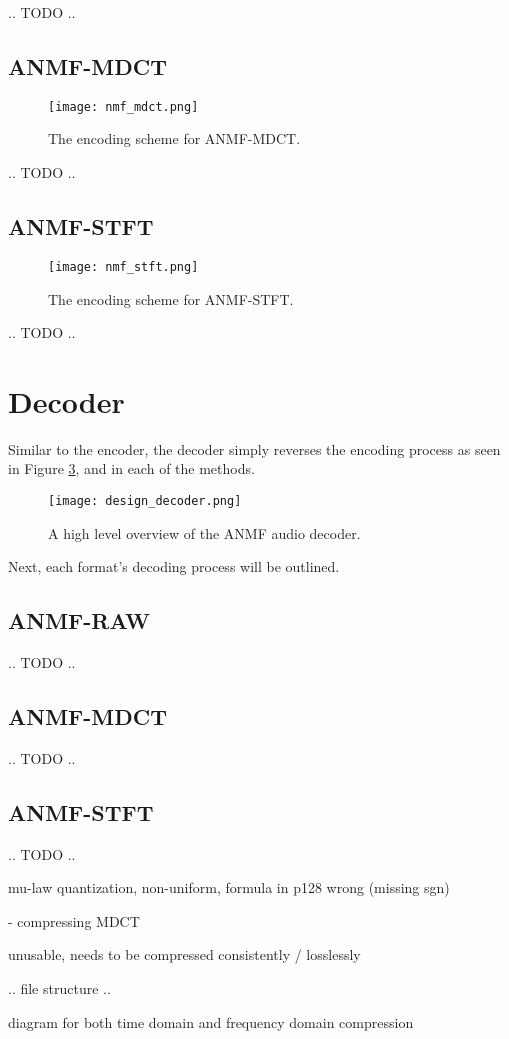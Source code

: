 .. TODO ..

\subsection{ANMF-MDCT}
\begin{figure}[ht]
	\label{fig:encoding_nmf_mdct}
	\caption[ANMF-MDCT Encoder]{The encoding scheme for ANMF-MDCT.}
	\centering
	\texttt{[image: nmf\_mdct.png]}
\end{figure}

.. TODO ..

\subsection{ANMF-STFT}
\begin{figure}[ht]
	\label{fig:encoding_nmf_stft}
	\caption[ANMF-STFT Encoder]{The encoding scheme for ANMF-STFT.}
	\centering
	\texttt{[image: nmf\_stft.png]}
\end{figure}

.. TODO ..

\section{Decoder}
Similar to the encoder, the decoder simply reverses the encoding process as seen in Figure \ref{fig:design_decoder}, and in each of the methods.

\begin{figure}[ht]
	\label{fig:design_decoder}
	\caption[Decoder overview]{A high level overview of the ANMF audio decoder.}
	\centering
	\texttt{[image: design\_decoder.png]}
\end{figure}

Next, each format's decoding process will be outlined.

\subsection{ANMF-RAW}
.. TODO ..

\subsection{ANMF-MDCT}
.. TODO ..

\subsection{ANMF-STFT}
.. TODO ..

mu-law quantization, non-uniform, formula in p128 wrong (missing sgn)\

- compressing MDCT

unusable, needs to be compressed consistently / losslessly

.. file structure ..

diagram for both time domain and frequency domain compression

